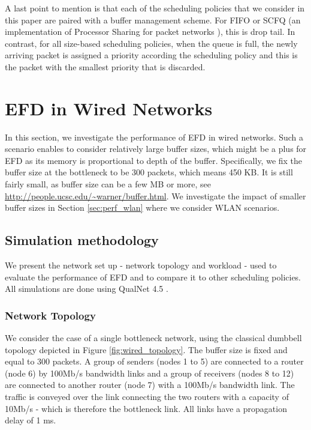 \documentclass[preprint,12pt]{elsarticle}
\begin{document}
A last point to mention is that each of the scheduling policies that we consider in this paper are paired with a buffer management scheme. For FIFO or SCFQ (an implementation of Processor Sharing for packet networks \cite{Golestani94}), this is drop tail. In contrast, for all size-based scheduling policies, when the queue is full, the newly arriving packet is assigned a priority according the scheduling policy and this is the packet with the smallest priority that is discarded.


\section{EFD in Wired Networks}
\label{sec:perf_wired}
In this section, we investigate the performance of EFD in wired networks. Such a scenario enables to consider relatively large buffer sizes, which might be a plus for EFD as its memory is proportional to depth of the buffer. Specifically, we fix the buffer size at the bottleneck to be 300 packets, which means 450 KB. It is still fairly small, as buffer size can be a few MB or more, see \url{http://people.ucsc.edu/~warner/buffer.html}. We investigate the impact of smaller buffer sizes in Section \ref{sec:perf_wlan} where we consider WLAN scenarios.%

\subsection{Simulation methodology} \label{sec:wired_methodology}
We present the network set up - network topology and workload - used to evaluate the performance of EFD and to compare it to other scheduling policies. All simulations are done using QualNet 4.5 \cite{Qualnet}.

\subsubsection{Network Topology}
We consider the case of a single bottleneck network, using the classical dumbbell topology depicted in Figure \ref{fig:wired_topology}. The buffer size is  fixed and equal to 300 packets. A group of senders (nodes 1 to 5) are connected to a router (node 6) by 100Mb/s bandwidth links and a group of receivers (nodes 8 to 12) are connected to another router (node 7) with a 100Mb/s bandwidth link. The traffic is conveyed over the link connecting the two routers with a capacity of 10Mb/s - which is therefore the bottleneck link. All links have a propagation delay of 1 ms.
\end{document}
